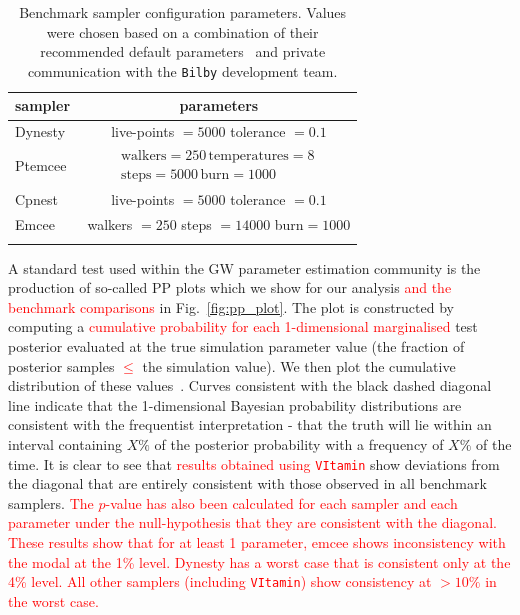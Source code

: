 \documentclass[%
showpacs,
nofootinbib,
 amsmath,amssymb,
 aps,
 twocolumn,
 prl,
 reprint,
floatfix,
]{revtex4-1}
\newcommand{\new}[1]{\textcolor{red}{#1}}
\begin{document}
%
%
\begin{table}
\centering
\caption{Benchmark sampler configuration parameters. Values were chosen based
on a combination of their recommended default parameters~\cite{1811.02042} and
private communication with the \texttt{Bilby} development team. }
\begin{tabular}[t]{lc}
\toprule
sampler & parameters \\
\hline
Dynesty~\cite{dynesty} & live-points $=5000$ tolerance $=0.1$ \\
Ptemcee~\cite{ptemcee} & $\begin{array}{c}\text{walkers}=250\,
\text{temperatures}=8\,
\\ \text{steps}=5000\, \text{burn}=1000\end{array}$ \\
Cpnest~\cite{cpnest} & live-points $=5000$ tolerance $=0.1$ \\
Emcee~\cite{emcee} & walkers $=250$ steps $=14000$ burn$=1000$ \\
\botrule
\end{tabular}
\label{Tab:sampler_params}
\end{table}

%
%
A standard test used within the \ac{GW} parameter estimation community is the
production of so-called \ac{PP} plots which we show for our analysis \new{and
the benchmark comparisons} in Fig.~\ref{fig:pp_plot}. The plot is constructed
by computing a \new{cumulative probability for each 1-dimensional marginalised}
test posterior evaluated at the true simulation parameter value (the fraction
of posterior samples \new{$\leq$} the simulation value). We then plot the
cumulative distribution of these values~\cite{1409.7215}. Curves consistent
with the black dashed diagonal line indicate that the 1-dimensional Bayesian
probability distributions are consistent with the frequentist interpretation -
that the truth will lie within an interval containing $X\%$ of the posterior
probability with a frequency of $X\%$ of the time. It is clear to see that
\new{results obtained using \texttt{VItamin}} show deviations from the diagonal
that are entirely consistent with those observed in all benchmark samplers.
\new{The $p$-value has also been calculated for each sampler and each parameter
under the null-hypothesis that they are consistent with the diagonal. These
results show that for at least 1 parameter, emcee shows inconsistency with the
modal at the 1\% level. Dynesty has a worst case that is consistent only at the
4\% level.  All other samplers (including \texttt{VItamin}) show consistency at
$>10\%$ in the worst case.}    
\end{document}
